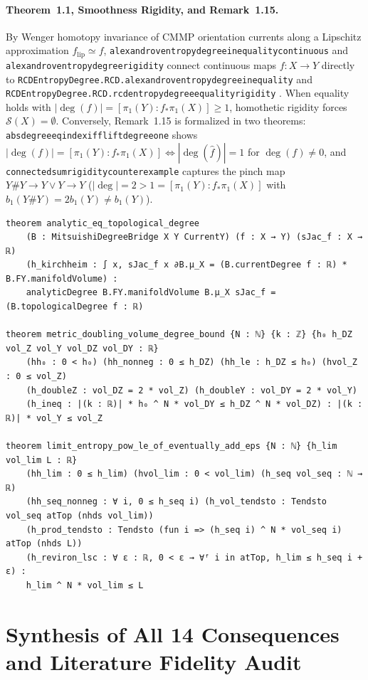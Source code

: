 \documentclass[10pt]{article}
\renewcommand{\_}{\origus\allowbreak}
\newcommand{\code}[1]{\texttt{#1}}
\begin{document}
\paragraph{Theorem~1.1, Smoothness Rigidity, and Remark~1.15.}
By Wenger homotopy invariance of CMMP orientation currents \cite{CMMP2026} along a Lipschitz
approximation $f_{\mathrm{lip}} \simeq f$, \code{alexandrov\_entropy\_degree\_inequality\_continuous}
and \code{alexandrov\_entropy\_degree\_rigidity} connect continuous maps $f : X \to Y$ directly to
\code{RCDEntropyDegree.RCD.alexandrov\_entropy\_degree\_inequality} and \code{RCDEntropyDegree.RCD.rcd\_entropy\_degree\_equality\_rigidity}
\cite{SuarezSerrato2026RCD}. When equality holds with $|\deg(f)| = [\pi_1(Y):f_*\pi_1(X)] \ge 1$,
homothetic rigidity forces $\mathcal{S}(X) = \emptyset$. Conversely, Remark~1.15 is formalized in two
theorems: \code{abs\_degree\_eq\_index\_iff\_lift\_degree\_one} shows $|\deg(f)| = [\pi_1(Y):f_*\pi_1(X)]
\iff |\deg(\hat{f})| = 1$ for $\deg(f) \neq 0$, and \code{connected\_sum\_rigidity\_counterexample}
captures the pinch map $Y \# Y \to Y \vee Y \to Y$ ($|\deg| = 2 > 1 = [\pi_1(Y):f_*\pi_1(X)]$ with
$b_1(Y \# Y) = 2 b_1(Y) \neq b_1(Y)$).

\begin{lstlisting}
theorem analytic_eq_topological_degree
    (B : MitsuishiDegreeBridge X Y CurrentY) (f : X → Y) (sJac_f : X → ℝ)
    (h_kirchheim : ∫ x, sJac_f x ∂B.μ_X = (B.currentDegree f : ℝ) * B.FY.manifoldVolume) :
    analyticDegree B.FY.manifoldVolume B.μ_X sJac_f = (B.topologicalDegree f : ℝ)

theorem metric_doubling_volume_degree_bound {N : ℕ} {k : ℤ} {h₀ h_DZ vol_Z vol_Y vol_DZ vol_DY : ℝ}
    (hh₀ : 0 < h₀) (hh_nonneg : 0 ≤ h_DZ) (hh_le : h_DZ ≤ h₀) (hvol_Z : 0 ≤ vol_Z)
    (h_doubleZ : vol_DZ = 2 * vol_Z) (h_doubleY : vol_DY = 2 * vol_Y)
    (h_ineq : |(k : ℝ)| * h₀ ^ N * vol_DY ≤ h_DZ ^ N * vol_DZ) : |(k : ℝ)| * vol_Y ≤ vol_Z

theorem limit_entropy_pow_le_of_eventually_add_eps {N : ℕ} {h_lim vol_lim L : ℝ}
    (hh_lim : 0 ≤ h_lim) (hvol_lim : 0 < vol_lim) (h_seq vol_seq : ℕ → ℝ)
    (hh_seq_nonneg : ∀ i, 0 ≤ h_seq i) (h_vol_tendsto : Tendsto vol_seq atTop (nhds vol_lim))
    (h_prod_tendsto : Tendsto (fun i => (h_seq i) ^ N * vol_seq i) atTop (nhds L))
    (h_reviron_lsc : ∀ ε : ℝ, 0 < ε → ∀ᶠ i in atTop, h_lim ≤ h_seq i + ε) :
    h_lim ^ N * vol_lim ≤ L
\end{lstlisting}

\section{Synthesis of All 14 Consequences and Literature Fidelity Audit}
\end{document}
